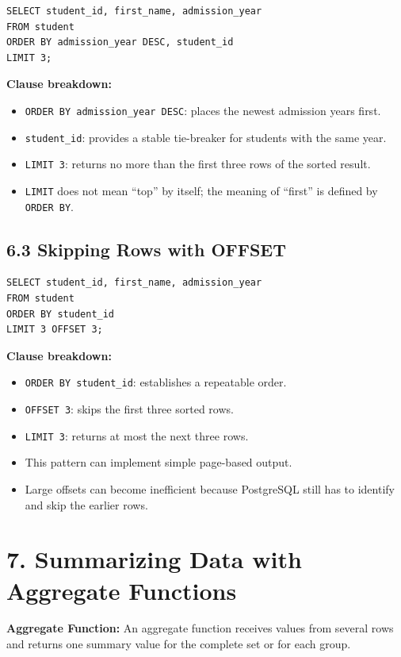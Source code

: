 \documentclass[12pt,a4paper]{article}
\newcommand{\defbox}[2]{%
  \vspace{0.2cm}
  \noindent\colorbox{boxgray}{\parbox{\dimexpr\linewidth-2\fboxsep}{%
    \textbf{#1:} #2
  }}
  \vspace{0.2cm}
}
\begin{document}
\begin{verbatim}
SELECT student_id, first_name, admission_year
FROM student
ORDER BY admission_year DESC, student_id
LIMIT 3;
\end{verbatim}

\noindent\textbf{Clause breakdown:}
\begin{itemize}
    \item \texttt{ORDER BY admission\_year DESC}: places the newest admission years first.
    \item \texttt{student\_id}: provides a stable tie-breaker for students with the same year.
    \item \texttt{LIMIT 3}: returns no more than the first three rows of the sorted result.
    \item \texttt{LIMIT} does not mean ``top'' by itself; the meaning of ``first'' is defined by
    \texttt{ORDER BY}.
\end{itemize}

\subsection*{6.3 Skipping Rows with OFFSET}
\begin{verbatim}
SELECT student_id, first_name, admission_year
FROM student
ORDER BY student_id
LIMIT 3 OFFSET 3;
\end{verbatim}

\noindent\textbf{Clause breakdown:}
\begin{itemize}
    \item \texttt{ORDER BY student\_id}: establishes a repeatable order.
    \item \texttt{OFFSET 3}: skips the first three sorted rows.
    \item \texttt{LIMIT 3}: returns at most the next three rows.
    \item This pattern can implement simple page-based output.
    \item Large offsets can become inefficient because PostgreSQL still has to identify and skip
    the earlier rows.
\end{itemize}

\section*{7. Summarizing Data with Aggregate Functions}
\defbox{Aggregate Function}{An aggregate function receives values from several rows and returns
one summary value for the complete set or for each group.}
\end{document}
